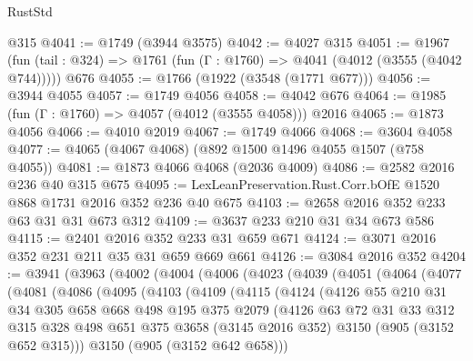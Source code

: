 \begin{lexlean}{RustStd}
\begin{coremodule}
    @315
@4041 := @1749 (@3944 @3575)
@4042 := @4027 @315
@4051 := @1967
    (fun (tail : @324) => @1761 (fun (Γ : @1760) => @4041 (@4012 (@3555 (@4042 @744)))))
    @676
@4055 := @1766 (@1922 (@3548 (@1771 @677)))
@4056 := @3944 @4055
@4057 := @1749 @4056
@4058 := @4042 @676
@4064 := @1985 (fun (Γ : @1760) => @4057 (@4012 (@3555 @4058))) @2016
@4065 := @1873 @4056
@4066 := @4010 @2019
@4067 := @1749 @4066
@4068 := @3604 @4058
@4077 := @4065 (@4067 @4068) (@892 @1500 @1496 @4055 @1507 (@758 @4055))
@4081 := @1873 @4066 @4068 (@2036 @4009)
@4086 := @2582 @2016 @236 @40 @315 @675
@4095 := LexLeanPreservation.Rust.Corr.bOfE @1520 @868 @1731 @2016 @352 @236 @40 @675
@4103 := @2658 @2016 @352 @233 @63 @31 @31 @673 @312
@4109 := @3637 @233 @210 @31 @34 @673 @586
@4115 := @2401 @2016 @352 @233 @31 @659 @671
@4124 := @3071 @2016 @352 @231 @211 @35 @31 @659 @669 @661
@4126 := @3084 @2016 @352
@4204 := @3941
    (@3963
      (@4002
        (@4004
          (@4006
            (@4023
              (@4039
                (@4051
                  (@4064
                    (@4077
                      (@4081
                        (@4086
                          (@4095
                            (@4103
                              (@4109
                                (@4115
                                  (@4124
                                    (@4126
                                      @55
                                      @210
                                      @31
                                      @34
                                      @305
                                      @658
                                      @668
                                      @498
                                      @195
                                      @375
                                      @2079
                                      (@4126
                                        @63
                                        @72
                                        @31
                                        @33
                                        @312
                                        @315
                                        @328
                                        @498
                                        @651
                                        @375
                                        @3658
                                        (@3145 @2016 @352)
                                        @3150
                                        (@905 (@3152 @652 @315)))
                                      @3150
                                      (@905 (@3152 @642 @658)))

\end{coremodule}
\end{lexlean}
